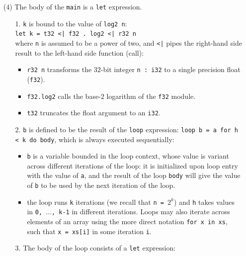 \documentclass[acmsmall,review]{acmart}\settopmatter{printfolios=true,printccs=false,printacmref=false}
\begin{document}
\begin{itemize}
    \item[(4)] The body of the {\tt main} is a \lstinline{let} expression.
        \begin{itemize}
              \item[1.] {\tt k} is bound to the value of {\tt log2 n}:\\
                \lstinline{let k = t32 <| f32 . log2 <| r32 n}\\
                where {\tt n} is assumed to be a power of two, and {\tt <|} pipes
                the right-hand side result to the left-hand side function (call): 
                \begin{itemize} 
                \item \lstinline{r32 n} transforms the $32$-bit integer \lstinline{n : i32}
                to a single precision float (\lstinline{f32}).
                \item \lstinline{f32.log2} calls the base-$2$ logarithm of the
                \lstinline{f32} module.
                \item \lstinline{t32} truncates the float argument to an \lstinline{i32}.
                \end{itemize}
              \item[2.] {\tt b} is defined to be the result of the \lstinline{loop}
                expression: \lstinline{loop b = a for h < k do body}, which is always
                executed sequentially: 
                \begin{itemize} 
                    \item {\tt b} is a variable bounded in the loop context, whose 
                value is variant across different iterations of the loop: it is initialized 
                upon loop entry with the value of {\tt a}, and the result of
                the loop {\tt body} will give the value of {\tt b} to be used by
                the next iteration of the loop.
                    \item the loop runs {\tt k} iterations (we recall that {\tt n = $2^k$})
                and {\tt h} takes values in {\tt 0, $\ldots$, k-1} in different iterations.
                Loops may also iterate across elements of an array using the more direct
                notation \lstinline{for x in xs}, such that {\tt x = xs[i]} in some iteration 
                {\tt i}.
                \end{itemize}
            \item[3.] The body of the loop consists of a \lstinline{let} expression:

\end{itemize}
\end{itemize}
\end{document}
